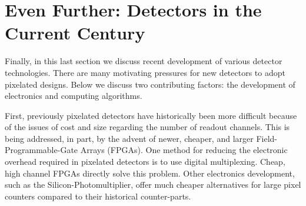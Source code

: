 

\section{Even Further: Detectors in the Current Century}

Finally, in this last section we discuss recent development of various detector technologies.
There are many motivating pressures for new detectors to adopt pixelated designs. 
Below we discuss two contributing factors: the development of electronics and computing algorithms.

First, previously pixelated detectors have historically been more difficult because of the issues of cost and size regarding the number of readout channels.
This is being addressed, in part, by the advent of newer, cheaper, and larger Field-Programmable-Gate Arrays (FPGAs).
One method for reducing the electronic overhead required in pixelated detectors is to use digital multiplexing.
Cheap, high channel FPGAs directly solve this problem. 
Other electronics development, such as the Silicon-Photomultiplier, offer much cheaper alternatives for large pixel counters compared to their historical counter-parts. 

